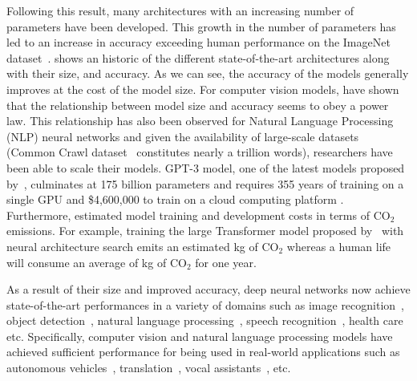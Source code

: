 Following this result, many architectures with an increasing number of parameters have been developed.
This growth in the number of parameters has led to an increase in accuracy exceeding human performance on the ImageNet dataset~\cite{he2015delving}.
 shows an historic of the different state-of-the-art architectures along with their size, and accuracy.
As we can see, the accuracy of the models generally improves at the cost of the model size.
For computer vision models, \citet{tan2019efficientnet} have shown that the relationship between model size and accuracy seems to obey a power law.
This relationship has also been observed for Natural Language Processing (NLP) neural networks \cite{rosenfeld2020a,kaplan2020scaling} and given the availability of large-scale datasets (Common Crawl dataset~\cite{raffel2019exploring} constitutes nearly a trillion words), researchers have been able to scale their models.
GPT-3 model, one of the latest models proposed by~\citet{brown2020language}, culminates at 175 billion parameters and requires 355 years of training on a single GPU and \$4,600,000 to train on a cloud computing platform \cite{li2020overview}.
Furthermore, \citet{strubell2019energy} estimated model training and development costs in terms of $\mathrm{CO}_2$ emissions.
For example, training the large Transformer model proposed by~\cite{vaswani2017attention} with neural architecture search emits an estimated  kg of $\mathrm{CO}_2$ whereas a human life will consume an average of  kg of $\mathrm{CO}_2$ for one year.

As a result of their size and improved accuracy, deep neural networks now achieve state-of-the-art performances in a variety of domains such as image recognition~\cite{lecun1998gradient,krizhevsky2012imagenet,he2016deep,tan2019efficientnet}, object detection~\cite{redmon2016you,liu2016ssd,redmon2017yolo9000}, natural language processing~\cite{merity2016pointer,vaswani2017attention,radford2018Language,brown2020language}, speech recognition~\cite{hinton2012deep,abdel2014convolutional,yu2016automatic}, health care \cite{faust2018deep} etc.
Specifically, computer vision and natural language processing models have achieved sufficient performance for being used in real-world applications such as autonomous vehicles~\cite{fagnant2015preparing,sharma2021automating}, translation~\cite{wu2016google}, vocal assistants~\cite{li2017acoustic}, etc.

